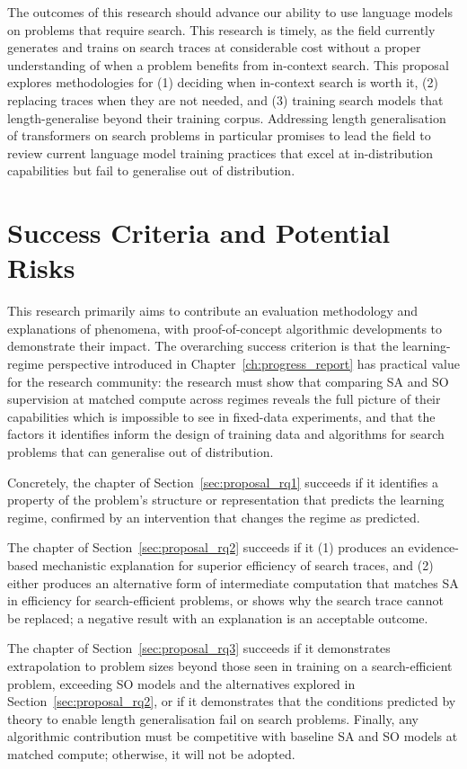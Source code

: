 The outcomes of this research should advance our ability to use language models on problems that require search.
This research is timely, as the field currently generates and trains on search traces at considerable cost without a proper understanding of when a problem benefits from in-context search.
This proposal explores methodologies for (1) deciding when in-context search is worth it, (2) replacing traces when they are not needed, and (3) training search models that length-generalise beyond their training corpus.
Addressing length generalisation of transformers on search problems in particular promises to lead the field to review current language model training practices that excel at in-distribution capabilities but fail to generalise out of distribution.

\section{Success Criteria and Potential Risks}
\label{sec:proposal_success}

This research primarily aims to contribute an evaluation methodology and explanations of phenomena, with proof-of-concept algorithmic developments to demonstrate their impact.
The overarching success criterion is that the learning-regime perspective introduced in Chapter~\ref{ch:progress_report} has practical value for the research community: the research must show that comparing SA and SO supervision at matched compute across regimes reveals the full picture of their capabilities which is impossible to see in fixed-data experiments, and that the factors it identifies inform the design of training data and algorithms for search problems that can generalise out of distribution.

Concretely, the chapter of Section~\ref{sec:proposal_rq1} succeeds if it identifies a property of the problem's structure or representation that predicts the learning regime, confirmed by an intervention that changes the regime as predicted.

The chapter of Section~\ref{sec:proposal_rq2} succeeds if it (1) produces an evidence-based mechanistic explanation for superior efficiency of search traces, and (2) either produces an alternative form of intermediate computation that matches SA in efficiency for search-efficient problems, or shows why the search trace cannot be replaced; a negative result with an explanation is an acceptable outcome.

The chapter of Section~\ref{sec:proposal_rq3} succeeds if it demonstrates extrapolation to problem sizes beyond those seen in training on a search-efficient problem, exceeding SO models and the alternatives explored in Section~\ref{sec:proposal_rq2}, or if it demonstrates that the conditions predicted by theory to enable length generalisation fail on search problems.
Finally, any algorithmic contribution must be competitive with baseline SA and SO models at matched compute; otherwise, it will not be adopted.

